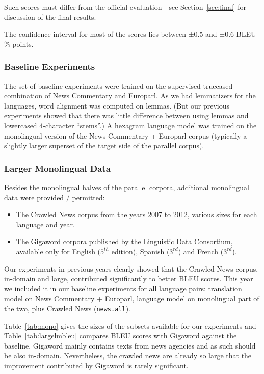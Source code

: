 \documentclass[11pt,letterpaper]{article}
\def\Tref#1{Table~\ref{#1}}
\def\Sref#1{Section~\ref{#1}}
\begin{document}
Such scores must differ from the official evaluation---see \Sref{sec:final} for discussion of the final results.

The confidence interval for most of the scores lies between ±0.5 and ±0.6 BLEU $\%$ points.



\subsubsection{Baseline Experiments}

The set of baseline experiments were trained on the supervised truecased
combination of News Commentary and Europarl.
As we had lemmatizers for the languages, word alignment was computed on lemmas.
(But our previous experiments showed that there was little difference
between using lemmas and lowercased 4-character ``stems''.)
A hexagram language model was trained on the monolingual version of the
News Commentary + Europarl corpus (typically a slightly larger superset
of the target side of the parallel corpus).



\subsubsection{Larger Monolingual Data}
\label{sec:lm}

Besides the monolingual halves of the parallel corpora, additional monolingual data were provided / permitted:

\begin{itemize}
\item The Crawled News corpus from the years 2007 to 2012, various sizes for each language and year.
\item The Gigaword corpora published by the Linguistic Data Consortium, available only for English ($5^{th}$ edition), Spanish ($3^{rd}$) and French ($3^{rd}$).
\end{itemize}

Our experiments in previous years clearly showed that the Crawled News corpus, in-domain and large, contributed
significantly to better BLEU scores. This year we included it in our baseline experiments
for all language pairs: translation model on News Commentary + Europarl,
language model on monolingual part of the two, plus Crawled News (\texttt{news.all}).

\Tref{tab:mono} gives the sizes of the subsets available for our experiments and \Tref{tab:largelmbleu} compares BLEU scores with Gigaword against the baseline.
Gigaword mainly contains texts from news agencies and as such should be also in-domain.
Nevertheless, the crawled news are already so large that the improvement contributed by Gigaword
is rarely significant.
\end{document}
